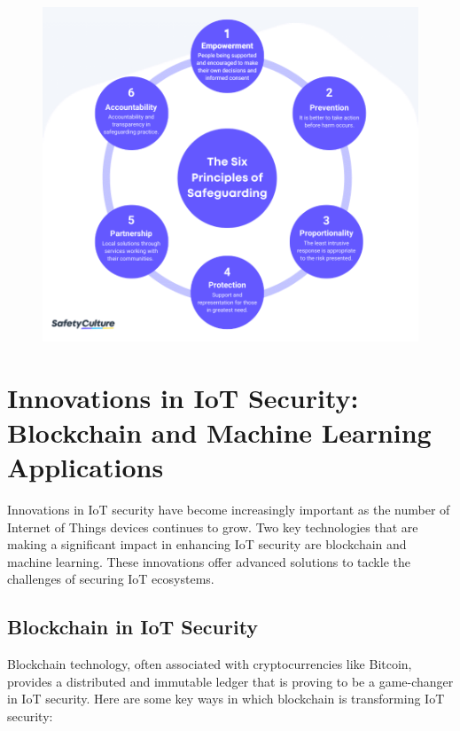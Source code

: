 \documentclass[conference]{IEEEtran}
\begin{document}
\begin{figure}
    \centering
    \includegraphics[width=1\linewidth]{6-Principles-of-Safeguarding.jpg}
    
\end{figure}
\section{Innovations in IoT Security: Blockchain and Machine Learning Applications}

Innovations in IoT security have become increasingly important as the number of Internet of Things devices continues to grow. Two key technologies that are making a significant impact in enhancing IoT security are blockchain and machine learning. These innovations offer advanced solutions to tackle the challenges of securing IoT ecosystems.

\subsection{Blockchain in IoT Security}
Blockchain technology, often associated with cryptocurrencies like Bitcoin, provides a distributed and immutable ledger that is proving to be a game-changer in IoT security. Here are some key ways in which blockchain is transforming IoT security:
\end{document}
